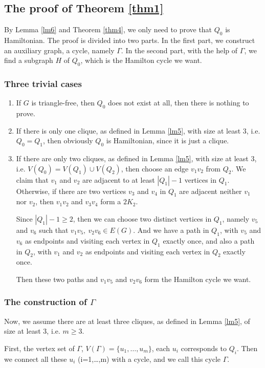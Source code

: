 \documentclass{amsart}
\begin{document}
\subsection{The proof of Theorem \ref{thm1}}
By Lemma \ref{lm6} and Theorem \ref{thm4}, we only need to prove that $Q_0$ is Hamiltonian.
The proof is divided into two parts. In the first part, we construct an auxiliary graph, a cycle, namely $\Gamma$. In the second part, with the help of $\Gamma$, we find a subgraph $H$ of $Q_0$,  which is the Hamilton cycle we want.
\subsubsection{Three trivial cases}
\begin{enumerate}
\item If $G$ is triangle-free, then $Q_0$ does not exist at all, then there is nothing to prove.
\item If there is only one clique, as defined in Lemma \ref{lm5}, with size at least 3, i.e. $Q_0=Q_1$, then obviously $Q_0$ is Hamiltonian, since it is just a clique.
\item If there are only two cliques, as defined in Lemma \ref{lm5}, with size at least 3, i.e. $V(Q_0)=V(Q_1)\cup V(Q_2)$, then choose an edge $v_1v_2$ from $Q_2$. We claim that $v_1$ and $v_2$ are adjacent to at least $|Q_1|-1$ vertices in $Q_1$. Otherwise, if there are two vertices $v_3$ and $v_4$ in $Q_1$ are adjacent neither $v_1$ nor $v_2$, then $v_1v_2$ and $v_3v_4$ form a $2K_2$.

Since $|Q_1|-1\ge2$, then we can choose two distinct vertices in $Q_1$, namely $v_5$ and $v_6$ such that $v_1v_5,~v_2v_6\in E(G)$. And we have a path in  $Q_1$, with $v_5$ and $v_6$ as endpoints and visiting each vertex in $Q_1$ exactly once, and also a path in $Q_2$, with $v_1$ and $v_2$ as endpoints and visiting each vertex in $Q_2$ exactly once.

Then these two paths and $v_1v_5$ and $v_2v_6$ form the Hamilton cycle we want.
\end{enumerate}

\subsubsection{The construction of $\Gamma$}

Now, we assume there are at least three cliques, as defined in Lemma \ref{lm5}, of size at least 3, i.e. $m\ge3$.

First, the vertex set of $\Gamma$, $V(\Gamma)=\{u_1,\ldots,u_m\}$, each $u_i$ corresponds to $Q_i$. 
Then we connect all these $u_i$ (i=1,\ldots,m) with a cycle, and we call this cycle $\Gamma$.
\end{document}
